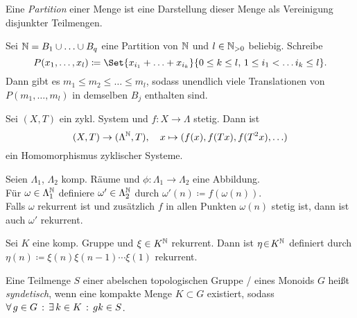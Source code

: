 \documentclass{cheat-sheet}
\begin{document}
\begin{defn}
  Eine \emph{Partition} einer Menge ist eine Darstellung dieser Menge als Vereinigung disjunkter Teilmengen.
\end{defn}

\begin{lem}
  Sei $\mathbb{N} = B_1 \cup \ldots \cup B_q$ eine Partition von $\mathbb{N}$ und $l \in \mathbb{N}_{>0}$ beliebig.
  Schreibe
  \[ P(x_1, \ldots, x_l) \coloneqq \Set{ x_{i_1} + \ldots + x_{i_k} }{0 \leq k \leq l, \, 1 \leq i_1 < \ldots i_k \leq l}. \]
  Dann gibt es $m_1 \leq m_2 \leq \ldots \leq m_l$, sodass unendlich viele Translationen von $P(m_1, \ldots, m_l)$ in demselben $B_j$ enthalten sind.
\end{lem}

\begin{bem}
  Sei $(X, T)$ ein zykl. System und $f : X \to \Lambda$ stetig. Dann ist
  \[
    (X, T) \to (\Lambda^{\mathbb{N}}, T), \quad
    x \mapsto (f(x), f(Tx), f(T^2x), \ldots)
  \]
  ein Homomorphismus zyklischer Systeme.

\end{bem}

\begin{thm}
  Seien $\Lambda_1$, $\Lambda_2$ komp. Räume und $\phi : \Lambda_1 \to \Lambda_2$ eine Abbildung. \\
  Für $\omega \in \Lambda_1^{\mathbb{N}}$ definiere $\omega' \in \Lambda_2^{\mathbb{N}}$ durch $\omega'(n) \coloneqq f(\omega(n))$. \\
  Falls $\omega$ rekurrent ist und zusätzlich $f$ in allen Punkten $\omega(n)$ stetig ist, dann ist auch $\omega'$ rekurrent.
\end{thm}


\begin{prop}
  Sei $K$ eine komp. Gruppe und $\xi \in K^{\mathbb{N}}$ rekurrent. Dann ist $\eta \!\in\! K^{\mathbb{N}}$ definiert durch $\eta(n) \coloneqq \xi(n) \xi(n-1) \cdots \xi(1)$ rekurrent.
\end{prop}



\begin{defn}
  Eine Teilmenge $S$ einer abelschen topologischen Gruppe / eines Monoids $G$ heißt \emph{syndetisch}, wenn eine kompakte Menge $K \subset G$ existiert, sodass $\forall \, {g \in G} \,:\, \exists \, {k \in K} \,:\, gk \in S$.
\end{defn}
\end{document}
